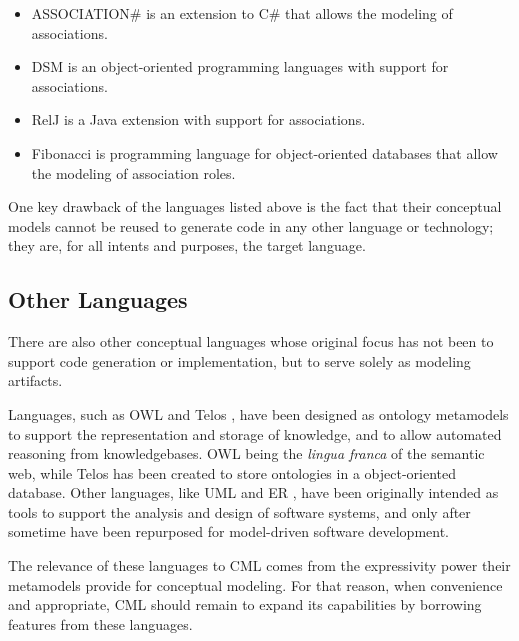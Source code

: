 \begin{itemize}

\item ASSOCIATION\# \cite{cardoso} is an extension to C\# that allows the modeling of associations.

\item DSM \cite{balzer} is an object-oriented programming languages with support for associations.

\item RelJ \cite{bierman} is a Java extension with support for associations.

\item Fibonacci \cite{fibonacci}  is programming language for object-oriented databases
that allow the modeling of association roles.

\end{itemize}

One key drawback of the languages listed above is the fact that their conceptual models
cannot be reused to generate code in any other language or technology;
they are, for all intents and purposes, the target language.

\subsection{Other Languages}

There are also other conceptual languages whose original focus has not been to support code generation or implementation,
but to serve solely as modeling artifacts.

Languages, such as OWL \cite{owl2} and Telos \cite{telos}, have been designed as ontology metamodels
to support the representation and storage of knowledge,
and to allow automated reasoning from knowledgebases.
OWL being the \emph{lingua franca} of the semantic web,
while Telos has been created to store ontologies in a object-oriented database.
Other languages, like UML \cite{uml} and ER \cite{er}, have been originally intended as tools to support the analysis and design of software systems, and only after sometime have been repurposed for model-driven software development.

The relevance of these languages to CML comes from the expressivity power their metamodels provide for conceptual modeling. For that reason, when convenience and appropriate, CML should remain to expand its capabilities by borrowing features from these languages.
